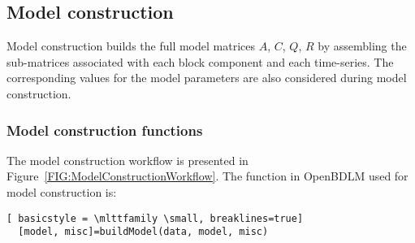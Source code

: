 \subsection{Model construction}
\label{S:MODELCONSTRUCTION}

Model construction builds the full model matrices $A$, $C$, $Q$, $R$ by assembling the sub-matrices associated with each block component and each time-series.
The corresponding values for the model parameters are also considered during model construction.

\subsubsection{Model construction functions}

The model construction workflow is presented in Figure~\ref{FIG:ModelConstructionWorkflow}. The function in OpenBDLM used for model construction is:

\begin{description}[style=unboxed]
\item[Builds the model ] \leavevmode
  \begin{lstlisting}[ basicstyle = \mlttfamily \small, breaklines=true]
  [model, misc]=buildModel(data, model, misc)
 \end{lstlisting}
\end{description}

